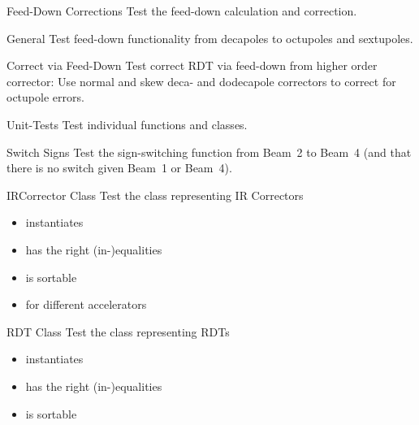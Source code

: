 \begin{testlist}
\begin{testlist}
    \end{testlist}
\item[Feed-Down Corrections] Test the feed-down calculation and correction.
    \begin{testlist}
        \item[General] Test feed-down functionality from decapoles to octupoles and sextupoles.
        \item[Correct via Feed-Down] Test correct RDT via feed-down from higher order corrector: 
        Use normal and skew deca- and dodecapole correctors to correct for octupole errors.
    \end{testlist}
\item[Unit-Tests] Test individual functions and classes.
    \begin{testlist}
        \item[Switch Signs] Test the sign-switching function from Beam~2 to Beam~4 (and that there is no switch given Beam~1 or Beam~4).
        \item[IRCorrector Class] Test the class representing IR Correctors
        \begin{itemize}
            \item instantiates
            \item has the right (in-)equalities 
            \item is sortable
            \item for different accelerators
        \end{itemize}
        \item[RDT Class] Test the class representing RDTs
        \begin{itemize}
            \item instantiates
            \item has the right (in-)equalities 
            \item is sortable
        \end{itemize}
    \end{testlist}
\end{testlist}

